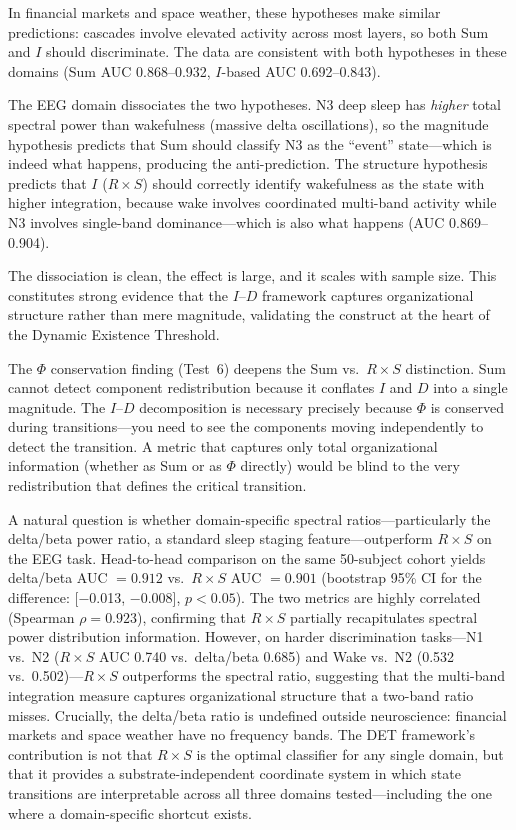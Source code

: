 \documentclass[12pt,a4paper]{article}
\begin{document}
In financial markets and space weather, these hypotheses make similar predictions: cascades involve elevated activity across most layers, so both Sum and $I$ should discriminate. The data are consistent with both hypotheses in these domains (Sum AUC 0.868--0.932, $I$-based AUC 0.692--0.843).

The EEG domain dissociates the two hypotheses. N3 deep sleep has \emph{higher} total spectral power than wakefulness (massive delta oscillations), so the magnitude hypothesis predicts that Sum should classify N3 as the ``event'' state---which is indeed what happens, producing the anti-prediction. The structure hypothesis predicts that $I$ ($R \times S$) should correctly identify wakefulness as the state with higher integration, because wake involves coordinated multi-band activity while N3 involves single-band dominance---which is also what happens (AUC 0.869--0.904).

The dissociation is clean, the effect is large, and it scales with sample size. This constitutes strong evidence that the $I$--$D$ framework captures organizational structure rather than mere magnitude, validating the construct at the heart of the Dynamic Existence Threshold.

The $\Phi$ conservation finding (Test~6) deepens the Sum vs.\ $R \times S$ distinction. Sum cannot detect component redistribution because it conflates $I$ and $D$ into a single magnitude. The $I$--$D$ decomposition is necessary precisely because $\Phi$ is conserved during transitions---you need to see the components moving independently to detect the transition. A metric that captures only total organizational information (whether as Sum or as $\Phi$ directly) would be blind to the very redistribution that defines the critical transition.

A natural question is whether domain-specific spectral ratios---particularly the delta/beta power ratio, a standard sleep staging feature---outperform $R \times S$ on the EEG task. Head-to-head comparison on the same 50-subject cohort yields delta/beta AUC $= 0.912$ vs.\ $R \times S$ AUC $= 0.901$ (bootstrap 95\% CI for the difference: [$-$0.013, $-$0.008], $p < 0.05$). The two metrics are highly correlated (Spearman $\rho = 0.923$), confirming that $R \times S$ partially recapitulates spectral power distribution information. However, on harder discrimination tasks---N1 vs.\ N2 ($R \times S$ AUC 0.740 vs.\ delta/beta 0.685) and Wake vs.\ N2 (0.532 vs.\ 0.502)---$R \times S$ outperforms the spectral ratio, suggesting that the multi-band integration measure captures organizational structure that a two-band ratio misses. Crucially, the delta/beta ratio is undefined outside neuroscience: financial markets and space weather have no frequency bands. The DET framework's contribution is not that $R \times S$ is the optimal classifier for any single domain, but that it provides a substrate-independent coordinate system in which state transitions are interpretable across all three domains tested---including the one where a domain-specific shortcut exists.
\end{document}
